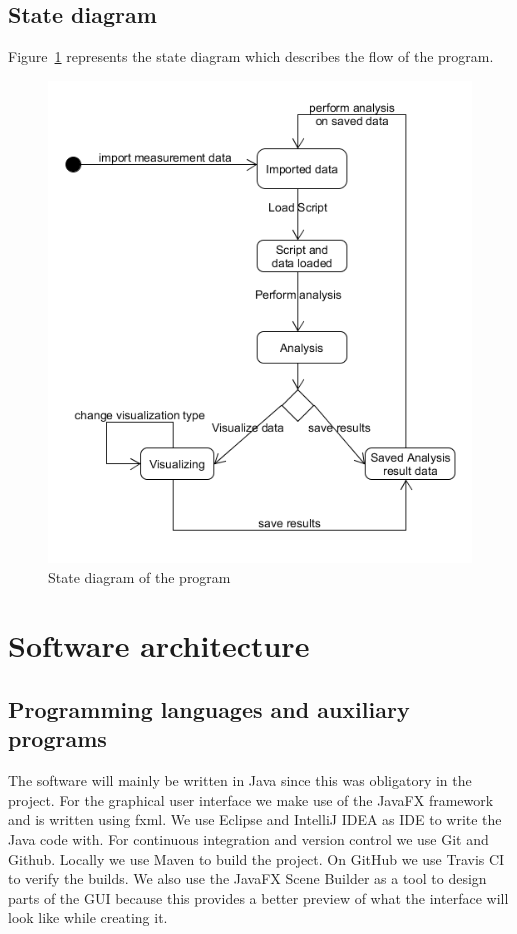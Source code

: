 \documentclass[a4paper]{article}
\begin{document}
\subsection{State diagram}
Figure~\ref{fig:statemachine} represents the state diagram which describes the flow of the program.
\begin{figure}[h]
	\centering
	\includegraphics[scale=0.5]{images/statemachine.png}
	\caption{State diagram of the program}
	\label{fig:statemachine}
\end{figure}

\section{Software architecture}

\subsection{Programming languages and auxiliary programs}
The software will mainly be written in Java since this was obligatory in
the project. For the graphical user interface we make use of the JavaFX
framework and is written using fxml. We use Eclipse and IntelliJ IDEA as IDE to
write the Java code with. 
For continuous integration and version control we use Git and Github. Locally we use Maven to build the project. On GitHub we use Travis CI to verify the builds.
We also use the JavaFX Scene Builder as a tool to design parts of the GUI because this provides a better preview of what the interface will look like while creating it.
\end{document}
